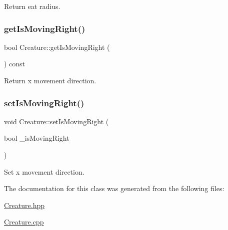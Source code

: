 Return eat radius. 

\mbox{\label{class_creature_a63abd829cfac5d57425452b39f2a21b7}} 
\subsubsection{\texorpdfstring{get\+Is\+Moving\+Right()}{getIsMovingRight()}}
{\footnotesize\ttfamily bool Creature\+::get\+Is\+Moving\+Right (\begin{DoxyParamCaption}{ }\end{DoxyParamCaption}) const}



Return x movement direction. 

\mbox{\label{class_creature_a7b222797d42b668ebf2a02eef51feaf8}} 
\subsubsection{\texorpdfstring{set\+Is\+Moving\+Right()}{setIsMovingRight()}}
{\footnotesize\ttfamily void Creature\+::set\+Is\+Moving\+Right (\begin{DoxyParamCaption}\item[{bool}]{\+\_\+is\+Moving\+Right }\end{DoxyParamCaption})}



Set x movement direction. 



The documentation for this class was generated from the following files\+:\begin{DoxyCompactItemize}
\item 
\mbox{\hyperlink{_creature_8hpp}{Creature.\+hpp}}\item 
\mbox{\hyperlink{_creature_8cpp}{Creature.\+cpp}}\end{DoxyCompactItemize}
